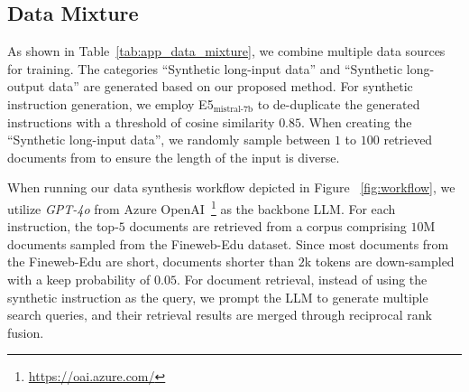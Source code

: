 \documentclass{article}
\begin{document}
\subsection{Data Mixture}
\begin{table}[ht]
\centering
\caption{Training data mixture.
``\# samples'' denotes the number of samples after de-duplication and domain-balanced sampling.
``\# packed 256k samples'' is the number of samples after being packed into sequences of $256$k tokens.}
\label{tab:app_data_mixture}
\end{table}

As shown in Table~\ref{tab:app_data_mixture},
we combine multiple data sources for training.
The categories ``Synthetic long-input data'' and ``Synthetic long-output data'' are generated based on our proposed method.
For synthetic instruction generation,
we employ E5$_\text{mistral-7b}$ to de-duplicate the generated instructions with a threshold of cosine similarity $0.85$.
When creating the ``Synthetic long-input data'',
we randomly sample between $1$ to $100$ retrieved documents from
to ensure the length of the input is diverse.

When running our data synthesis workflow depicted in Figure ~\ref{fig:workflow},
we utilize \emph{GPT-4o} from Azure OpenAI~\footnote{\url{https://oai.azure.com/}} as the backbone LLM.
For each instruction,
the top-$5$ documents are retrieved from a corpus comprising $10$M documents sampled from the Fineweb-Edu dataset.
Since most documents from the Fineweb-Edu are short,
documents shorter than $2$k tokens are down-sampled with a keep probability of $0.05$.
For document retrieval,
instead of using the synthetic instruction as the query,
we prompt the LLM to generate multiple search queries,
and their retrieval results are merged through reciprocal rank fusion.
\end{document}
